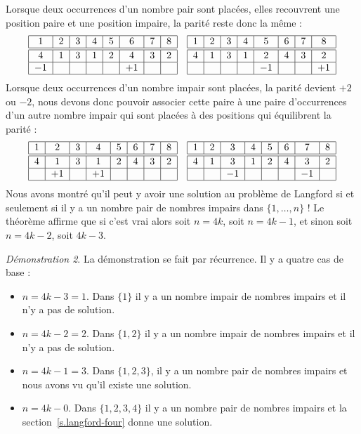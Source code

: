 Lorsque deux occurrences d'un nombre pair sont placées, elles recouvrent une position paire et une position impaire, la parité reste donc la même :
\[
\addtolength{\arraycolsep}{1pt}
\begin{array}{|c|c|c|c|c|c|c|c|}
\hline
1&2&3&4&5&6&7&8\\
\hline\hline
4&1&3&1&2&4&3&2\\\hline
-1&&&&&+1&&\\\hline
\end{array}
\hspace{1em}
\begin{array}{|c|c|c|c|c|c|c|c|}
\hline
1&2&3&4&5&6&7&8\\
\hline\hline
4&1&3&1&2&4&3&2\\\hline
&&&&-1&&&+1\\\hline
\end{array}
\]
Lorsque deux occurrences d'un nombre impair sont placées, la parité devient $+2$ ou $-2$, nous devons donc pouvoir associer cette paire à une paire d'occurrences d'un autre nombre impair qui sont placées à des positions qui équilibrent la parité :
\[
\addtolength{\arraycolsep}{1pt}
\begin{array}{|c|c|c|c|c|c|c|c|}
\hline
1&2&3&4&5&6&7&8\\
\hline\hline
4&1&3&1&2&4&3&2\\\hline
&+1&&+1&&&&\\\hline
\end{array}
\hspace{1em}
\begin{array}{|c|c|c|c|c|c|c|c|}
\hline
1&2&3&4&5&6&7&8\\
\hline\hline
4&1&3&1&2&4&3&2\\\hline
&&-1&&&&-1&\\\hline
\end{array}
\]
Nous avons montré qu'il peut y avoir une solution au problème de Langford si et seulement si il y a un nombre pair de nombres impairs dans $\{1,\ldots,n\}$ !
Le théorème affirme que si c'est vrai alors soit $n=4k$, soit $n=4k-1$, et sinon soit $n=4k-2$, soit $4k-3$.

\medskip

\noindent \emph{Démonstration 2}.   
La démonstration se fait par récurrence.
Il y a quatre cas de base :
\begin{itemize}
\item $n=4k-3=1$. Dans $\{1\}$ il y a un nombre impair de nombres impairs et il n'y a pas de solution.
\item $n=4k-2=2$. Dans $\{1,2\}$ il y a un nombre impair de nombres impairs et il n'y a pas de solution.
\item $n=4k-1=3$. Dans $\{1,2,3\}$, il y a un nombre pair de nombres impairs et nous avons vu qu'il existe une solution.
\item $n=4k-0$. Dans $\{1,2,3,4\}$ il y a un nombre pair de nombres impairs et la section~\ref{s.langford-four} donne une solution.
\end{itemize}

